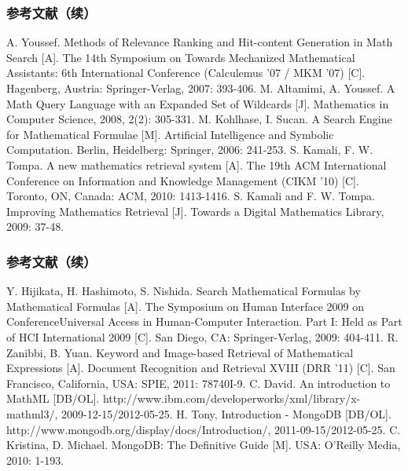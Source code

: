 \documentclass[17pt]{beamer}
\begin{document}
    \begin{frame}
        \frametitle{参考文献（续）}
        \vspace{-1.5cm}
        \begin{thebibliography}{}
             A. Youssef. Methods of Relevance Ranking and Hit-content Generation in Math Search [A]. The 14th Symposium on Towards Mechanized Mathematical Assistants: 6th International Conference (Calculemus '07 / MKM '07) [C]. Hagenberg, Austria: Springer-Verlag, 2007: 393-406.
             M. Altamimi, A. Youssef. A Math Query Language with an Expanded Set of Wildcards [J]. Mathematics in Computer Science, 2008, 2(2): 305-331.
             M. Kohlhase, I. Sucan. A Search Engine for Mathematical Formulae [M]. Artificial Intelligence and Symbolic Computation. Berlin, Heidelberg: Springer, 2006: 241-253.
             S. Kamali, F. W. Tompa. A new mathematics retrieval system [A]. The 19th ACM International Conference on Information and Knowledge Management (CIKM '10) [C]. Toronto, ON, Canada: ACM, 2010: 1413-1416.
             S. Kamali and F. W. Tompa. Improving Mathematics Retrieval [J]. Towards a Digital Mathematics Library, 2009: 37-48.
        \end{thebibliography}
    \end{frame}

    \begin{frame}
        \frametitle{参考文献（续）}
        \vspace{-1.5cm}
        \begin{thebibliography}{}
             Y. Hijikata, H. Hashimoto, S. Nishida. Search Mathematical Formulas by Mathematical Formulas [A]. The Symposium on Human Interface 2009 on ConferenceUniversal Access in Human-Computer Interaction. Part I: Held as Part of HCI International 2009 [C]. San Diego, CA: Springer-Verlag, 2009: 404-411.
             R. Zanibbi, B. Yuan. Keyword and Image-based Retrieval of Mathematical Expressions [A]. Document Recognition and Retrieval XVIII  (DRR '11) [C].  San Francisco, California, USA: SPIE, 2011: 78740I-9.
             C. David. An introduction to MathML [DB/OL]. http://www.ibm.com/developerworks/xml/library/x-mathml3/, 2009-12-15/2012-05-25.
             H. Tony, Introduction - MongoDB [DB/OL]. http://www.mongodb.org/display/docs/Introduction/, 2011-09-15/2012-05-25.
             C. Kristina, D. Michael. MongoDB: The Definitive Guide [M]. USA: O’Reilly Media, 2010: 1-193.
        \end{thebibliography}
    \end{frame}
\end{document}
